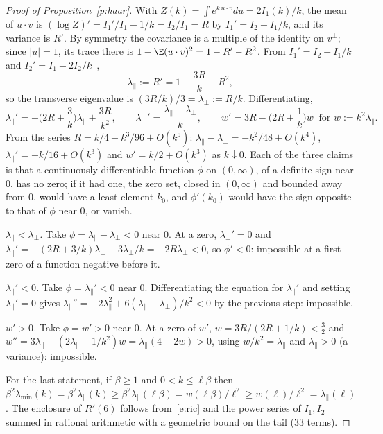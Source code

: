 \begin{proof}[Proof of Proposition~\ref{p:haar}]
With $Z(k)=\int e^{k\,u\cdot v}du=2I_1(k)/k$, the mean of $u\cdot v$ is $(\log Z)'=I_1'/I_1-1/k=I_2/I_1=R$ by
$I_1'=I_2+I_1/k$, and its variance is $R'$. By symmetry the covariance is a multiple of the identity on
$v^\perp$; since $|u|=1$, its trace there is $1-\E(u\cdot v)^2=1-R'-R^2$. From $I_1'=I_2+I_1/k$ and
$I_2'=I_1-2I_2/k$~\cite[10.29.2]{DLMF},
\begin{equation}\label{e:ric}
\lambda_\parallel:=R'=1-\frac{3R}{k}-R^2,
\end{equation}
so the transverse eigenvalue is $(3R/k)/3=\lambda_\perp:=R/k$. Differentiating,
\[
\lambda_\parallel'=-\Big(2R+\frac3k\Big)\lambda_\parallel+\frac{3R}{k^2},\qquad \lambda_\perp'=\frac{\lambda_\parallel-\lambda_\perp}{k},\qquad
w'=3R-\Big(2R+\frac1k\Big)w\ \text{ for }w:=k^2\lambda_\parallel .
\]
From the series $R=k/4-k^3/96+O(k^5)$: $\lambda_\parallel-\lambda_\perp=-k^2/48+O(k^4)$, $\lambda_\parallel'=-k/16+O(k^3)$ and $w'=k/2+O(k^3)$ as
$k\downarrow0$. Each of the three claims is that a continuously differentiable function $\phi$ on $(0,\infty)$,
of a definite sign near $0$, has no zero; if it had one, the zero set, closed in $(0,\infty)$ and bounded away
from $0$, would have a least element $k_0$, and $\phi'(k_0)$ would have the sign opposite to that of $\phi$
near $0$, or vanish.

\emph{$\lambda_\parallel<\lambda_\perp$.} Take $\phi=\lambda_\parallel-\lambda_\perp<0$ near $0$. At a zero, $\lambda_\perp'=0$ and $\lambda_\parallel'=-(2R+3/k)\lambda_\perp+3\lambda_\perp/k=-2R\lambda_\perp<0$, so $\phi'<0$:
impossible at a first zero of a function negative before it.

\emph{$\lambda_\parallel'<0$.} Take $\phi=\lambda_\parallel'<0$ near $0$. Differentiating the equation for $\lambda_\parallel'$ and setting $\lambda_\parallel'=0$ gives
$\lambda_\parallel''=-2\lambda_\parallel^{2}+6(\lambda_\parallel-\lambda_\perp)/k^2<0$ by the previous step: impossible.

\emph{$w'>0$.} Take $\phi=w'>0$ near $0$. At a zero of $w'$, $w=3R/(2R+1/k)<\tfrac32$ and
$w''=3\lambda_\parallel-(2\lambda_\parallel-1/k^2)w=\lambda_\parallel(4-2w)>0$, using $w/k^2=\lambda_\parallel$ and $\lambda_\parallel>0$ (a variance): impossible.

For the last statement, if $\beta\ge1$ and $0<k\le \ell\beta$ then
$\beta^2\lambda_{\min}(k)=\beta^2\lambda_\parallel(k)\ge\beta^2\lambda_\parallel(\ell\beta)=w(\ell\beta)/\ell^2\ge w(\ell)/\ell^2=\lambda_\parallel(\ell)$. The enclosure of $R'(6)$ follows
from~\eqref{e:ric} and the power series of $I_1,I_2$ summed in rational arithmetic with a geometric bound on
the tail (33 terms).
\end{proof}

